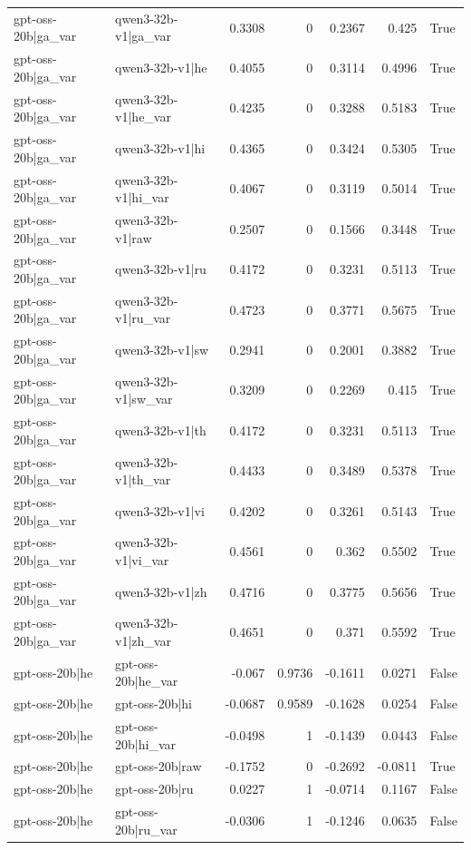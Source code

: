 \begin{table}
\begin{tabular}{l l r r r r l}
gpt-oss-20b|ga_var & qwen3-32b-v1|ga_var & 0.3308 & 0 & 0.2367 & 0.425 & True \\
gpt-oss-20b|ga_var & qwen3-32b-v1|he & 0.4055 & 0 & 0.3114 & 0.4996 & True \\
gpt-oss-20b|ga_var & qwen3-32b-v1|he_var & 0.4235 & 0 & 0.3288 & 0.5183 & True \\
gpt-oss-20b|ga_var & qwen3-32b-v1|hi & 0.4365 & 0 & 0.3424 & 0.5305 & True \\
gpt-oss-20b|ga_var & qwen3-32b-v1|hi_var & 0.4067 & 0 & 0.3119 & 0.5014 & True \\
gpt-oss-20b|ga_var & qwen3-32b-v1|raw & 0.2507 & 0 & 0.1566 & 0.3448 & True \\
gpt-oss-20b|ga_var & qwen3-32b-v1|ru & 0.4172 & 0 & 0.3231 & 0.5113 & True \\
gpt-oss-20b|ga_var & qwen3-32b-v1|ru_var & 0.4723 & 0 & 0.3771 & 0.5675 & True \\
gpt-oss-20b|ga_var & qwen3-32b-v1|sw & 0.2941 & 0 & 0.2001 & 0.3882 & True \\
gpt-oss-20b|ga_var & qwen3-32b-v1|sw_var & 0.3209 & 0 & 0.2269 & 0.415 & True \\
gpt-oss-20b|ga_var & qwen3-32b-v1|th & 0.4172 & 0 & 0.3231 & 0.5113 & True \\
gpt-oss-20b|ga_var & qwen3-32b-v1|th_var & 0.4433 & 0 & 0.3489 & 0.5378 & True \\
gpt-oss-20b|ga_var & qwen3-32b-v1|vi & 0.4202 & 0 & 0.3261 & 0.5143 & True \\
gpt-oss-20b|ga_var & qwen3-32b-v1|vi_var & 0.4561 & 0 & 0.362 & 0.5502 & True \\
gpt-oss-20b|ga_var & qwen3-32b-v1|zh & 0.4716 & 0 & 0.3775 & 0.5656 & True \\
gpt-oss-20b|ga_var & qwen3-32b-v1|zh_var & 0.4651 & 0 & 0.371 & 0.5592 & True \\
gpt-oss-20b|he & gpt-oss-20b|he_var & -0.067 & 0.9736 & -0.1611 & 0.0271 & False \\
gpt-oss-20b|he & gpt-oss-20b|hi & -0.0687 & 0.9589 & -0.1628 & 0.0254 & False \\
gpt-oss-20b|he & gpt-oss-20b|hi_var & -0.0498 & 1 & -0.1439 & 0.0443 & False \\
gpt-oss-20b|he & gpt-oss-20b|raw & -0.1752 & 0 & -0.2692 & -0.0811 & True \\
gpt-oss-20b|he & gpt-oss-20b|ru & 0.0227 & 1 & -0.0714 & 0.1167 & False \\
gpt-oss-20b|he & gpt-oss-20b|ru_var & -0.0306 & 1 & -0.1246 & 0.0635 & False \\

\end{tabular}
\end{table}
